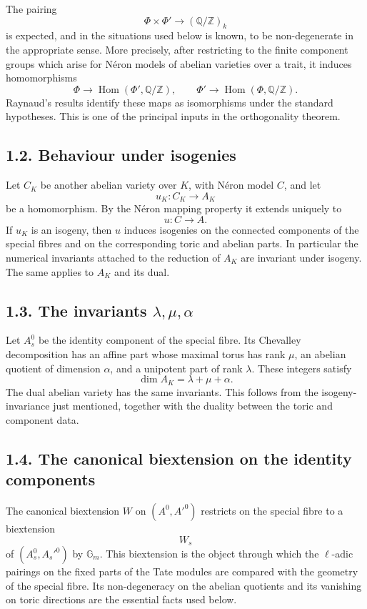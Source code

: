 \documentclass[11pt]{article}
\theoremstyle{plain}
\theoremstyle{definition}
\theoremstyle{remark}
\newcommand{\bQ}{\mathbb Q}
\newcommand{\bZ}{\mathbb Z}
\DeclareMathOperator{\Hom}{Hom}
\newcommand{\Gm}{\mathbb G_m}
\begin{document}
The pairing
\[
\Phi\times\Phi'\to(\bQ/\bZ)_k
\]
is expected, and in the situations used below is known, to be non-degenerate in
the appropriate sense. More precisely, after restricting to the finite component
groups which arise for Néron models of abelian varieties over a trait, it induces
homomorphisms
\[
\Phi\longrightarrow \Hom(\Phi',\bQ/\bZ),\qquad
\Phi'\longrightarrow \Hom(\Phi,\bQ/\bZ).
\]
Raynaud's results identify these maps as isomorphisms under the standard
hypotheses. This is one of the principal inputs in the orthogonality theorem.

\subsection*{1.2. Behaviour under isogenies}

Let \(C_K\) be another abelian variety over \(K\), with Néron model \(C\), and
let
\[
u_K:C_K\to A_K
\]
be a homomorphism. By the Néron mapping property it extends uniquely to
\[
u:C\to A.
\]
If \(u_K\) is an isogeny, then \(u\) induces isogenies on the connected
components of the special fibres and on the corresponding toric and abelian
parts. In particular the numerical invariants attached to the reduction of
\(A_K\) are invariant under isogeny. The same applies to \(A_K\) and its dual.

\subsection*{1.3. The invariants \(\lambda,\mu,\alpha\)}

Let \(A_s^0\) be the identity component of the special fibre. Its Chevalley
decomposition has an affine part whose maximal torus has rank \(\mu\), an
abelian quotient of dimension \(\alpha\), and a unipotent part of rank
\(\lambda\). These integers satisfy
\[
\dim A_K=\lambda+\mu+\alpha.
\]
The dual abelian variety has the same invariants. This follows from the
isogeny-invariance just mentioned, together with the duality between the toric
and component data.

\subsection*{1.4. The canonical biextension on the identity components}

The canonical biextension \(W\) on \((A^0,A'^0)\) restricts on the special fibre
to a biextension
\[
W_s
\]
of \((A_s^0,A_s'^0)\) by \(\Gm\). This biextension is the object through which
the \(\ell\)-adic pairings on the fixed parts of the Tate modules are compared
with the geometry of the special fibre. Its non-degeneracy on the abelian
quotients and its vanishing on toric directions are the essential facts used
below.
\end{document}
